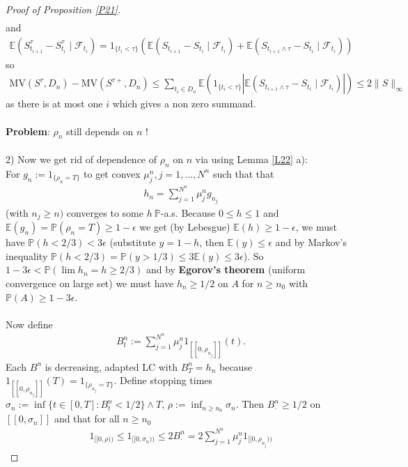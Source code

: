 \documentclass[12pt,a4paper, twoside]{article}
\theoremstyle{definition}
\newcommand{\EE}{\mathbb{E}} %
\newcommand{\PP}{\mathbb{P}} %
\newcommand{\MV}{\text{MV}}
\begin{document}
\begin{proof}[Proof of Proposition \ref{P21}]
\begin{align*}
\end{align*}
and 
\begin{align*}
\EE(S_{t_{i+1}}^\tau - S_{t_i}^\tau \mid \mathcal{F}_{t_i}) = 1_{\{t_i < \tau\}} ( \EE(S_{t_{i+1}}- S_{t_i} \mid \mathcal{F}_{t_i}) + \EE( S_{t_{i+1} \wedge \tau}- S_{t_i} \mid \mathcal{F}_{t_i}))
\end{align*}
so
\begin{align*}
\MV(S^\tau , D_n)- \MV(S^{\tau+}, D_n) \leq \sum_{t_i \in D_n} \EE(1_{\{t_i < \tau\}} | \EE( S_{t_{i+1} \wedge \tau} - S_{t_i} \mid \mathcal{F}_{t_i})|) \leq 2 \|S\|_\infty
\end{align*}
as there is at most one $i$ which gives a non zero summand. 
\\\\
\textbf{Problem}: $\rho_n$ still depends on $n$ !
\\\\
2) Now we get rid of dependence of $\rho_n$ on $n$ via using Lemma \ref{L22} a): \\ For $g_n := 1_{\{ \rho_n = T \}}$ to get convex $\mu_j^n, j= 1 , \dots , N^n$ such that that 
\begin{align*}
h_n = \sum_{j=1}^{N^n} \mu_j^n g_{n_j}
\end{align*} 
(with $n_j \geq n)$ converges to some $h \ \PP$-a.s.
\newpage
Because $0 \leq h \leq 1$ and $\EE(g_n)= \PP( \rho_n=T) \geq 1- \epsilon$ we get (by Lebesgue) $\EE(h) \geq 1- \epsilon$, we must have $\PP(h < 2/3) < 3 \epsilon$ (substitute $y=1-h$, then $\EE(y) \leq \epsilon$ and by Markov's inequality $\PP(h<2/3)=\PP(y>1/3) \leq 3 \EE(y) \leq 3 \epsilon$). So $1-3 \epsilon < \PP ( \lim h_n = h \geq 2/3)$ and by \textbf{Egorov's theorem} (uniform convergence on large set) we must have $h_n \geq 1/2$ on $A$ for $n \geq n_0$ with $\PP(A) \geq 1- 3 \epsilon$. \\
\\
Now define
\begin{align*}
B_t^n := \sum_{j=1}^{N^n} \mu_j^n 1_{[\![ 0 , \rho_{n_j} ]\!]} (t).
\end{align*}
Each $B^n$ is decreasing, adapted LC with $B_T^n = h_n$ because $1_{[\![0 , \rho_{n_j} ]\!]}(T)= 1_{\{ \rho_{n_j}=T\}}$. Define stopping times $\sigma_n := \inf \{ t \in [0,T] : B_t^n < 1/2\} \wedge T$, $\rho := \inf_{n \geq n_0} \sigma_n$. Then $B_\cdot^n \geq 1/2$ on $[\![0 , \sigma_n ]\!]$ and that for all $n \geq n_0$ 
\begin{align*}
1_{[\![ 0 , \rho)\!)} \leq 1_{ [\![ 0 , \sigma_n )\!)} \leq 2B_\cdot^n = 2 \sum_{j=1}^{N^n} \mu_j^n 1_{[\![ 0 , \rho_{n_j})\!)} \tag{**}

\end{align*}
\end{proof}
\end{document}
